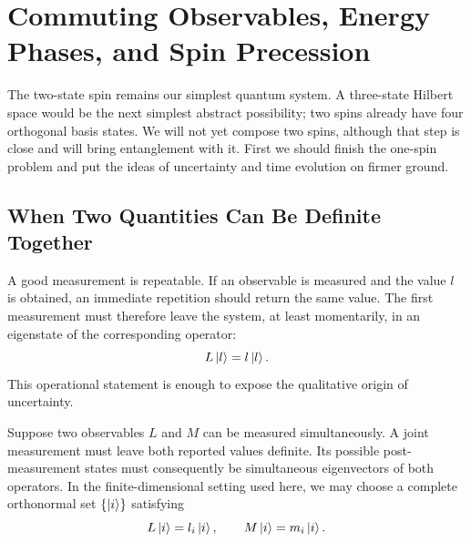 \chapter{Commuting Observables, Energy Phases, and Spin Precession}


The two-state spin remains our simplest quantum system. A three-state Hilbert space would be the next simplest abstract possibility; two spins already have four orthogonal basis states. We will not yet compose two spins, although that step is close and will bring entanglement with it. First we should finish the one-spin problem and put the ideas of uncertainty and time evolution on firmer ground.

\section{When Two Quantities Can Be Definite Together}

A good measurement is repeatable. If an observable is measured and the value \(l\) is obtained, an immediate repetition should return the same value. The first measurement must therefore leave the system, at least momentarily, in an eigenstate of the corresponding operator:
\begin{equation}
L\left\lvert l\right\rangle=l\left\lvert l\right\rangle.
\end{equation}
This operational statement is enough to expose the qualitative origin of uncertainty.

Suppose two observables \(L\) and \(M\) can be measured simultaneously. A joint measurement must leave both reported values definite. Its possible post-measurement states must consequently be simultaneous eigenvectors of both operators. In the finite-dimensional setting used here, we may choose a complete orthonormal set \(\{\left\lvert i\right\rangle\}\) satisfying
\begin{equation}
L\left\lvert i\right\rangle=l_i\left\lvert i\right\rangle,
\qquad
M\left\lvert i\right\rangle=m_i\left\lvert i\right\rangle.
\label{eq:l5-common-eigenvectors}
\end{equation}

